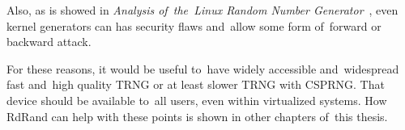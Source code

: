 \par{
Also, as is showed in {\em Analysis of~the~Linux Random Number Generator}~\cite{AnalysisOfLinuxRNG}, 
even kernel generators can has security flaws and~allow some form 
of~forward or backward attack. 
}

\par{
For these reasons, it would be useful to~have widely accessible and~widespread
 fast and~high quality TRNG or at least slower TRNG with CSPRNG. 
 That device should be available to~all users, even within virtualized systems. 
 How RdRand can help with these points is shown in other chapters 
 of~this thesis.
}
